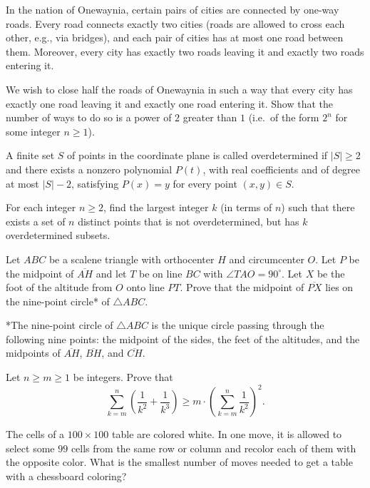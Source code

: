 \documentclass[11pt]{scrartcl}
\begin{document}
\begin{problem}[913214378150707]
In the nation of Onewaynia, certain pairs of cities are connected by one-way roads. Every road connects exactly two cities (roads are allowed to cross each other, e.g., via bridges), and each pair of cities has at most one road between them. Moreover, every city has exactly two roads leaving it and exactly two roads entering it.

We wish to close half the roads of Onewaynia in such a way that every city has exactly one road leaving it and exactly one road entering it. Show that the number of ways to do so is a power of $2$ greater than $1$ (i.e.\ of the form $2^n$ for some integer $n \ge 1$).
\end{problem}
\begin{problem}[244533208775214844]
A finite set $S$ of points in the coordinate plane is called overdetermined if $|S|\ge 2$ and there exists a nonzero polynomial $P(t)$, with real coefficients and of degree at most $|S|-2$, satisfying $P(x)=y$ for every point $(x,y)\in S$.

For each integer $n\ge 2$, find the largest integer $k$ (in terms of $n$) such that there exists a set of $n$ distinct points that is not overdetermined, but has $k$ overdetermined subsets.
\end{problem}
\begin{problem}[528087142744727]
	Let $ABC$ be a scalene triangle with orthocenter $H$ and circumcenter $O$. Let $P$ be the midpoint of $\overline{AH}$ and let $T$ be on line $BC$ with $\angle TAO=90^{\circ}$. Let $X$ be the foot of the altitude from $O$ onto line $PT$. Prove that the midpoint of $\overline{PX}$ lies on the nine-point circle* of $\triangle ABC$.

*The nine-point circle of $\triangle ABC$ is the unique circle passing through the following nine points: the midpoint of the sides, the feet of the altitudes, and the midpoints of $\overline{AH}$, $\overline{BH}$, and $\overline{CH}$.
\end{problem}
\begin{problem}[4479133443678014025]
Let $n\ge m\ge 1$ be integers. Prove that
\[\sum_{k=m}^n \left (\frac 1{k^2}+\frac 1{k^3}\right) \ge m\cdot \left(\sum_{k=m}^n \frac 1{k^2}\right)^2.\]
\end{problem}
\begin{problem}[685138775901874]
The cells of a $100 \times 100$ table are colored white. In one move, it is allowed to select some $99$ cells from the same row or column and recolor each of them with the opposite color. What is the smallest number of moves needed to get a table with a chessboard coloring?
\end{problem}
\end{document}

